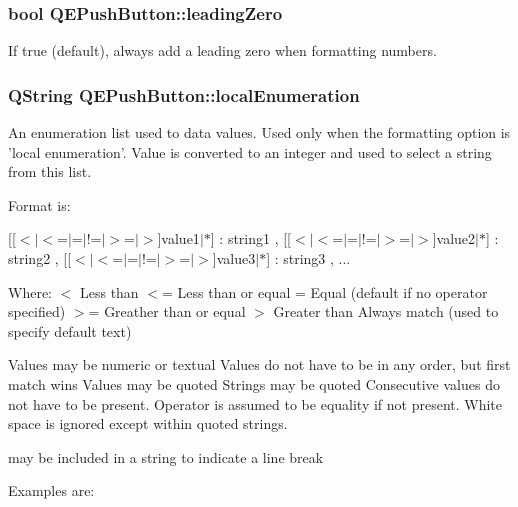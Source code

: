 \hypertarget{classQEPushButton_a39d427acaebc8383149f1ea0fda0c56c}{
\subsubsection[{leadingZero}]{\setlength{\rightskip}{0pt plus 5cm}bool QEPushButton::leadingZero}}
\label{classQEPushButton_a39d427acaebc8383149f1ea0fda0c56c}
If true (default), always add a leading zero when formatting numbers. \hypertarget{classQEPushButton_a5e5b76726d7536cd9779bcdc2b9ddd30}{
\subsubsection[{localEnumeration}]{\setlength{\rightskip}{0pt plus 5cm}QString QEPushButton::localEnumeration}}
\label{classQEPushButton_a5e5b76726d7536cd9779bcdc2b9ddd30}
An enumeration list used to data values. Used only when the formatting option is 'local enumeration'. Value is converted to an integer and used to select a string from this list.

Format is:

\mbox{[}\mbox{[}$<$$|$$<$=$|$=$|$!=$|$$>$=$|$$>$\mbox{]}value1$|$$\ast$\mbox{]} : string1 , \mbox{[}\mbox{[}$<$$|$$<$=$|$=$|$!=$|$$>$=$|$$>$\mbox{]}value2$|$$\ast$\mbox{]} : string2 , \mbox{[}\mbox{[}$<$$|$$<$=$|$=$|$!=$|$$>$=$|$$>$\mbox{]}value3$|$$\ast$\mbox{]} : string3 , ...

Where: $<$ Less than $<$= Less than or equal = Equal (default if no operator specified) $>$= Greather than or equal $>$ Greater than Always match (used to specify default text)

Values may be numeric or textual Values do not have to be in any order, but first match wins Values may be quoted Strings may be quoted Consecutive values do not have to be present. Operator is assumed to be equality if not present. White space is ignored except within quoted strings. \par
 may be included in a string to indicate a line break

Examples are:

